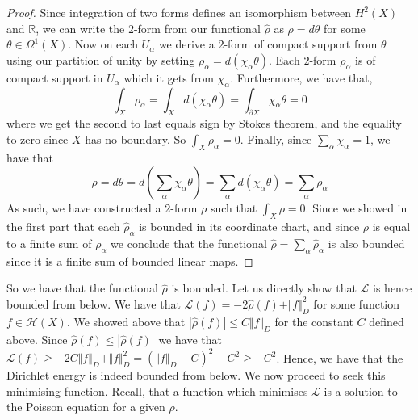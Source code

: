 \documentclass[11pt]{report}
\theoremstyle{definition}
\begin{document}
\begin{proof}
  Since integration of two forms defines an isomorphism between $H^2(X)$ and $\mathbb{R}$, we can write the $2$-form from our functional $\hat{\rho}$ as $\rho = d\theta$ for some $\theta \in \Omega^1(X)$. Now on each $U_{\alpha}$ we derive a $2$-form of compact support from $\theta$ using our partition of unity by setting $\rho_{\alpha} = d(\chi_{\alpha}\theta)$. Each $2$-form $\rho_{\alpha}$ is of compact support in $U_{\alpha}$ which it gets from $\chi_{\alpha}$. Furthermore, we have that,
  \[ \int_X\rho_{\alpha} = \int_X d(\chi_{\alpha}\theta) = \int_{\partial X} \chi_{\alpha}\theta = 0 \] where we get the second to last equals sign by Stokes theorem, and the equality to zero since $X$ has no boundary.
  So $\int_X \rho_{\alpha} = 0$. Finally, since $\sum_{\alpha} \chi_{\alpha} = 1$, we have that 
  \[ \rho = d\theta = d\left(\sum_{\alpha}\chi_{\alpha}\theta\right) = \sum_{\alpha}d(\chi_{\alpha}\theta) = \sum_{\alpha}\rho_{\alpha}\]
  As such, we have constructed a $2$-form $\rho$ such that $\int_X \rho = 0$. Since we showed in the first part that each $\hat{\rho}_{\alpha}$ is bounded in its coordinate chart, and since $\rho$ is equal to a finite sum of $\rho_{\alpha}$ we conclude that the functional $\hat{\rho} = \sum_{\alpha}\hat{\rho}_{\alpha}$ is also bounded since it is a finite sum of bounded linear maps.
\end{proof}

So we have that the functional $\hat{\rho}$ is bounded. Let us directly show that $\mathcal{L}$ is hence bounded from below.
We have that $\mathcal{L}(f) = -2\hat{\rho}(f) + \Vert f \Vert^2_D$ for some function $f \in \mathcal{H}(X)$. We showed above that $|\hat{\rho}(f)| \leq C \Vert f \Vert_D$ for the constant $C$ defined above. Since $\hat{\rho}(f) \leq |\hat{\rho}(f)|$ we have that $ \mathcal{L}(f) \geq -2C \Vert f \Vert_D + \Vert f \Vert^2_D = (\Vert f \Vert_D - C)^2 - C^2 \geq - C^2$. Hence, we have that the Dirichlet energy is indeed bounded from below. We now proceed to seek this minimising function. Recall, that a function which minimises $\mathcal{L}$ is a solution to the Poisson equation for a given $\rho$.
\end{document}
